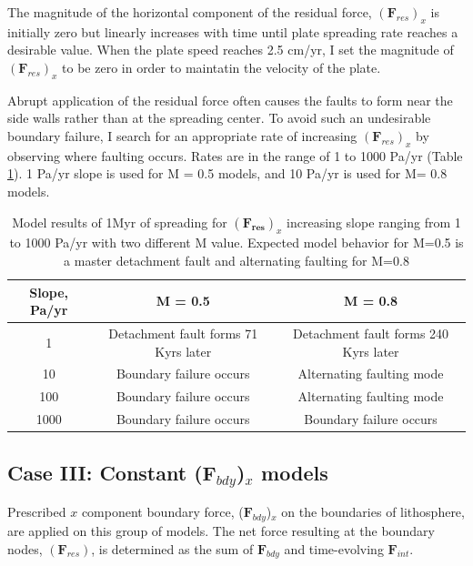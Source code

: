 \documentclass[letterpaper,12pt,notitle]{memphisthesis}                     %
\begin{document}
The magnitude of the horizontal component of the residual force, $(\boldsymbol{F}_{res})_{x}$ is initially zero but linearly increases with time until plate spreading rate reaches a desirable value. When the plate speed reaches 2.5 cm/yr, I set the magnitude of $(\boldsymbol{F}_{res})_{x}$ to be zero in order to maintatin the velocity of the plate.

Abrupt application of the residual force often causes the faults to form near the side walls rather than at the spreading center.
To avoid such an undesirable boundary failure, I search for an appropriate rate of increasing $(\boldsymbol{F}_{res})_{x}$ by observing where faulting occurs. Rates are in the range of 1 to 1000 Pa/yr (Table \ref{tab:slope}). 1 Pa/yr slope is used for M = 0.5 models, and 10 Pa/yr is used for M= 0.8 models. 
%
\begin{table}[h!]
	\centering
	\caption{Model results of 1Myr of spreading for $(\boldsymbol{F_{res}})_x$ increasing slope ranging from 1 to 1000 Pa/yr with two different M value. Expected model behavior for M=0.5 is a master detachment fault and alternating faulting for M=0.8}
	\label{tab:slope}
	\begin{tabular}{ccc}
		\toprule
		Slope, Pa/yr & M = 0.5 & M = 0.8\\
		\midrule
          	1 & Detachment fault forms 71 Kyrs later & Detachment fault forms 240 Kyrs later\\
		10 & Boundary failure occurs & Alternating faulting mode \\
		100 & Boundary failure occurs & Alternating faulting mode \\
		1000 & Boundary failure occurs & Boundary failure occurs\\
		\bottomrule
	\end{tabular}
\end{table}
%

\subsection{Case III: Constant ($\boldsymbol{F}_{bdy}$)$_x$ models}

Prescribed $x$ component boundary force, ($\boldsymbol{F}_{bdy}$)$_x$ on the boundaries of lithosphere, are applied on this group of models. The net force resulting at the boundary nodes, $(\boldsymbol{F}_{res})$, is determined as the sum of $\boldsymbol{F}_{bdy}$ and time-evolving $\boldsymbol{F}_{int}$.
\end{document}
